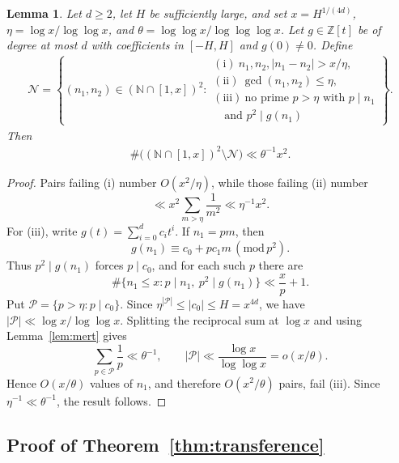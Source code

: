\documentclass[12pt,reqno]{amsart}
\numberwithin{equation}{section}
\newtheorem{lemma}[theorem]{Lemma}
\theoremstyle{definition}
\renewcommand{\le}{\leqslant}
\renewcommand{\geq}{\geqslant}
\newcommand{\ZZ}{\mathbb{Z}}
\newcommand{\NN}{\mathbb{N}}
\renewcommand{\pmod}[1]{\,(\mathrm{mod}\,#1)}
\begin{document}
\begin{lemma}\label{lem:pair-exception-count}
Let $d \geq 2$, let $H$ be sufficiently large, and set $x=H^{1/(4d)}$, $\eta=\log x/\log\log x$, and $\theta=\log\log x/\log\log\log x$.
Let $g \in \ZZ[t]$ be of degree at most $d$ with coefficients in $[-H, H]$ and $g(0) \neq 0$.
Define
\begin{align}\label{eq:def-pair-set}
\mathcal{N} = \left\{(n_1, n_2) \in (\NN \cap [1,x])^2: 
\begin{array}{l}
\mathrm{(i)}\ n_1, n_2, |n_1 - n_2| > x/ \eta, \\
\mathrm{(ii)}\ \gcd(n_1, n_2) \le \eta, \\
\mathrm{(iii)}\ \text{no prime } p > \eta \text{ with } p \mid n_1 \\
\quad\text{and } p^2 \mid g(n_1)
\end{array}
\right\}.
\end{align}
Then
\begin{align}\label{eq:pair-exception-bound}
\#\big((\NN \cap [1,x])^2 \setminus \mathcal{N}\big) \ll \theta^{-1} x^2.
\end{align}
\end{lemma}

\begin{proof}
Pairs failing \textup{(i)} number $O(x^2/\eta)$, while those failing \textup{(ii)} number
\[
\ll x^2\sum_{m>\eta}\frac1{m^2}
\ll\eta^{-1}x^2.
\]
For \textup{(iii)}, write $g(t)=\sum_{i=0}^{d}c_i t^i$.
If $n_1=pm$, then
\[
g(n_1)\equiv c_0+pc_1m\pmod{p^2}.
\]
Thus $p^2\mid g(n_1)$ forces $p\mid c_0$, and for each such $p$ there are
\[
\#\{n_1\le x:p\mid n_1,\ p^2\mid g(n_1)\}\ll \frac{x}{p}+1.
\]
Put $\mathcal{P}=\{p>\eta:p\mid c_0\}$.
Since $\eta^{|\mathcal{P}|} \le |c_0| \le H=x^{4d}$, we have $|\mathcal{P}|\ll \log x/\log\log x$.
Splitting the reciprocal sum at $\log x$ and using Lemma~\ref{lem:mert} gives
\[
\sum_{p\in\mathcal{P}}\frac1p\ll\theta^{-1},
\qquad
|\mathcal P|\ll\frac{\log x}{\log\log x}=o(x/\theta).
\]
Hence $O(x/\theta)$ values of $n_1$, and therefore $O(x^2/\theta)$ pairs, fail \textup{(iii)}.
Since $\eta^{-1}\ll\theta^{-1}$, the result follows.
\end{proof}

\subsection{Proof of Theorem~\ref{thm:transference}}
\end{document}
